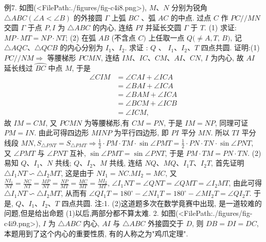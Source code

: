 例7. 如图(<FilePath:./figures/fig-c4i8.png>), $M 、 N$ 分别为锐角 $\triangle A B C (\angle A<\angle B)$ 的外接圆 $\Gamma$ 上弧 $B C$ 、弧 $A C$ 的中点.
过点 $C$ 作 $P C / / M N$ 交圆 $\Gamma$ 于点 $P, I$ 为 $\triangle A B C$ 的内心, 连结 $P I$ 并延长交圆 $\Gamma$ 于 $T$.
(1) 求证: $M P \cdot M T=N P \cdot N T$;
(2) 在弧 $A B$ (不含点 $C)$ 上任取一点 $Q(\neq A, T$, $B)$, 记 $\triangle A Q C 、 \triangle Q C B$ 的内心分别为 $I_1 、 I_2$. 求证 : $Q$ 、 $I_1 、 I_2 、 T$ 四点共圆.
证明:(1) $P C / / N M \Rightarrow$ 等腰梯形 $P C M N$, 连结 $I M 、 I C 、 C M 、 A I 、 C N$, $I$ 为内心, 故 $A I$ 延长线过 $\overparen{B C}$ 中点 $M$, 于是
$$
\begin{aligned}
\angle C I M & =\angle C A I+\angle I C A \\
& =\angle B A I+\angle I C A \\
& =\angle B A M+\angle I C A \\
& =\angle B C M+\angle I C B \\
& =\angle I C M,
\end{aligned}
$$
故 $I M=C M$, 又 $P C M N$ 为等腰梯形,有 $C M=P N$, 于是 $I M=N P$, 同理可证 $P M=I N$.
由此可得四边形 $M I N P$ 为平行四边形, 即 $P I$ 平分 $M N$.
所以 $T I$ 平分线段 $M N, S_{\triangle P N T}=S_{\triangle P M T} \Rightarrow \frac{1}{2} \cdot P M \cdot T M \cdot \sin \angle P M T= \frac{1}{2} \cdot P N \cdot T N \cdot \sin \angle P N T$, 又 $\angle P M T$ 与 $\angle P N T$ 互补, $\sin \angle P M T= \sin \angle P N T$, 于是 $P M \cdot T M=P N \cdot T N$.
(2)易知 $Q 、 I_1 、 N$ 共线; $Q 、 I_2 、 M$ 共线, 连结 $N Q 、 M Q 、 I_1 T 、 I_2 T$, 首先证明 $\triangle I_1 N T \backsim \triangle I_2 M T$, 这是由于 $N I_1=N C . M I_2=M C$, 又 $\frac{N I_1}{N T}=\frac{N C}{N T}=\frac{M P}{N T}= \frac{N P}{M T}=\frac{M C}{M T}=\frac{M I_2}{M T}$,
$\angle I_1 N T=\angle Q N T=\angle Q M T=\angle I_2 M T$, 由此可得 $\triangle I_1 N T \backsim \triangle I_2 M T$, 从而有 $\angle Q I_1 T=180^{\circ}-\angle N I_1 T=180^{\circ}-\angle M I_2 T=\angle Q I_2 T$.
于是, $Q 、 I_1 、 I_2 、 T$ 四点共圆.
注:1. (2)这道题多次在数学竟赛中出现, 是一道较难的问题,但是给出命题 (1)以后,两部分都不算太难.
2. 如图(<FilePath:./figures/fig-c4i9.png>), $I$ 为 $\triangle A B C$ 内心, $A I$ 与 $\triangle A B C$ 外接圆交于 $D$, 则 $D B=D I=D C$, 本题用到了这个内心的重要性质, 有的人称之为"鸡爪定理".



